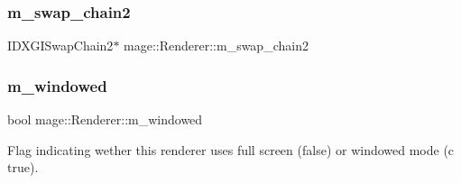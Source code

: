 \hypertarget{classmage_1_1_renderer_a64eb8b31f6835322d13e1d9b8ea9e113}{}\label{classmage_1_1_renderer_a64eb8b31f6835322d13e1d9b8ea9e113} 
\subsubsection{\texorpdfstring{m\+\_\+swap\+\_\+chain2}{m\_swap\_chain2}}
{\footnotesize\ttfamily I\+D\+X\+G\+I\+Swap\+Chain2$\ast$ mage\+::\+Renderer\+::m\+\_\+swap\+\_\+chain2\hspace{0.3cm}{\ttfamily [protected]}}

\hypertarget{classmage_1_1_renderer_a9215a05e35d22294adb87084422b98cd}{}\label{classmage_1_1_renderer_a9215a05e35d22294adb87084422b98cd} 
\subsubsection{\texorpdfstring{m\+\_\+windowed}{m\_windowed}}
{\footnotesize\ttfamily bool mage\+::\+Renderer\+::m\+\_\+windowed\hspace{0.3cm}{\ttfamily [protected]}}

Flag indicating wether this renderer uses full screen ({\ttfamily false}) or windowed mode (c true). 